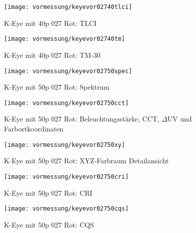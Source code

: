 \documentclass[pagesize,paper=A4,fontsize=12pt,utf8,numbers=noenddot,bibliography=totoc,listof=totoc,DIV=11,BCOR=1mm]{scrreprt}
\begin{document}
\begin{figure}[htp]     %
\centering
\texttt{[image: vormessung/keyevor02740tlci]} 
\caption {K-Eye mit 40p 027 Rot: TLCI} 
\end{figure}

\begin{figure}[htp]     %
\centering
\texttt{[image: vormessung/keyevor02740tm]} 
\caption {K-Eye mit 40p 027 Rot: TM-30} 
\end{figure}




\begin{figure}[htp]     %
\centering
\texttt{[image: vormessung/keyevor02750spec]} 
\caption {K-Eye mit 50p 027 Rot: Spektrum} 
\end{figure}

\begin{figure}[htp]     %
\centering
\texttt{[image: vormessung/keyevor02750cct]} 
\caption {K-Eye mit 50p 027 Rot: Beleuchtungsstärke, CCT, $\Delta$UV und Farbortkoordinaten} 
\end{figure}

\begin{figure}[htp]     %
\centering
\texttt{[image: vormessung/keyevor02750xy]} 
\caption {K-Eye mit 50p 027 Rot: XYZ-Farbraum Detailansicht} 
\end{figure}

\begin{figure}[htp]     %
\centering
\texttt{[image: vormessung/keyevor02750cri]} 
\caption {K-Eye mit 50p 027 Rot: CRI} 
\end{figure}

\begin{figure}[htp]     %
\centering
\texttt{[image: vormessung/keyevor02750cqs]} 
\caption {K-Eye mit 50p 027 Rot: CQS} 
\end{figure}
\end{document}
